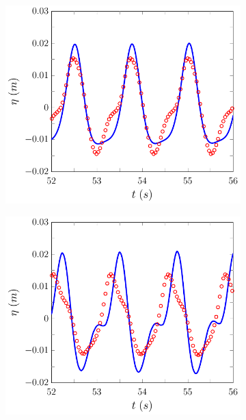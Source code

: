 \begin{figure}
	\centering
	\begin{subfigure}{0.5\textwidth}
		\includegraphics[width=\textwidth]{./chp6/figures/Experiment/Beji/sh/FDVMWG5.pdf}
		\vspace{0.5cm}
	\end{subfigure}%
	\begin{subfigure}{0.5\textwidth}
		\includegraphics[width=\textwidth]{./chp6/figures/Experiment/Beji/sh/FDVMWG6.pdf}

\end{subfigure}
\end{figure}
